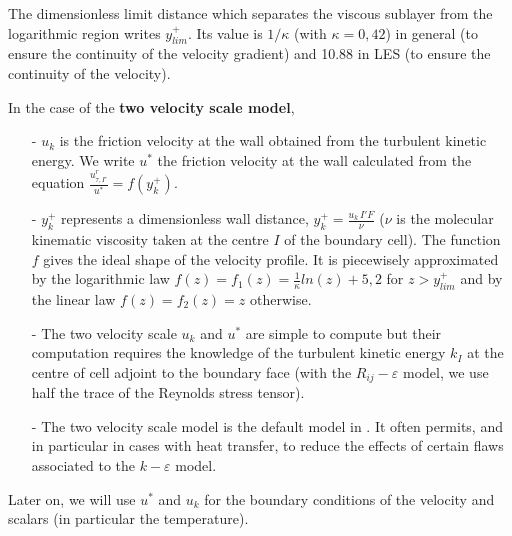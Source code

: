 The dimensionless limit distance which separates the viscous sublayer from the logarithmic region writes $y^+_{lim}$. Its value is $1/\kappa$ (with $\kappa = 0,42$) in general (to ensure the continuity of the velocity gradient) and 10.88 in LES (to ensure the continuity of the velocity).  

In the case of the {\bf two velocity scale model}, 
\begin{itemize}
\item [-] $u_k$ is the friction velocity at the wall obtained from the turbulent kinetic energy.
We write $u^*$ the friction velocity at the wall calculated from the equation
 $ \displaystyle\frac{u^r_{\tau,I'}}{u^*} = f(y^+_k)$.

\item [-]  
$y^+_k$  represents a dimensionless wall distance, 
$y^+_k= \displaystyle\frac{u_k\,I'F}{\nu}$ ($\nu$ is the molecular kinematic viscosity 
taken at the centre $I$ of the boundary cell).
The function $f$ gives the ideal shape of the velocity profile.
It is piecewisely approximated by the logarithmic law 
 $f(z)=f_1(z)= \displaystyle\frac{1}{\kappa}ln(z)+5,2$ for 
$z> y^+_{lim}$
and by the linear law $f(z)=f_2(z)=z$ otherwise.

\item [-] The two velocity scale $u_k$ and $u^*$ are simple to compute 
but their computation requires the knowledge of the turbulent kinetic energy $k_I$ 
at the centre of cell adjoint to the boundary face  (with the $R_{ij}-\varepsilon$ model, we use half the trace of the Reynolds stress tensor). 


\item [-] The two velocity scale model is the default model in \CS.
It often permits, and in particular in cases with heat transfer, to reduce the
effects of certain flaws associated to the $k-\varepsilon$ model.
\end{itemize}


Later on, we will use $u^*$ and $u_k$ for the boundary conditions of the velocity and scalars (in particular the temperature).


